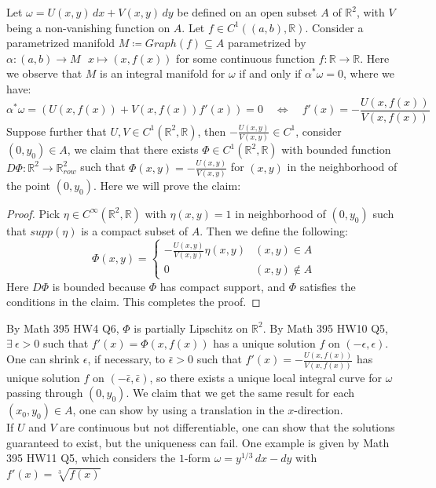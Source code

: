 \documentclass[15pt]{book}
\theoremstyle{break}
\theoremstyle{break}
\newcommand{\R}{\mathbb{R}}
\begin{document}
Let $\omega = U(x,y)\, dx + V(x,y) \, dy$ be defined on an open subset $A$ of $\R^2$, with $V$ being a non-vanishing function on $A$. Let $f \in C^1((a,b),\R)$. Consider a parametrized manifold $M\coloneqq Graph(f) \subseteq A$ parametrized by $\alpha:(a,b) \to M \ \ \ x\mapsto (x,f(x))$ for some continuous function $f:\R \to \R$. Here we observe that $M$ is an integral manifold for $\omega$ if and only if $\alpha^* \omega = 0$, where we have:
$$\alpha^*\omega = (U(x,f(x))+V(x,f(x))f'(x)) =0 \quad \iff \quad f'(x) =- \frac{U(x,f(x))}{V(x,f(x))}$$ 
Suppose further that $U,V \in C^1(\R^2,\R)$, then $-\frac{U(x,y)}{V(x,y)} \in C^1$, consider $(0,y_0) \in A$, we claim that there exists $\Phi \in C^1(\R^2,\R)$ with bounded function $D\Phi :\R^2 \to \R^2_{row}$ such that $\Phi (x,y) = -\frac{U(x,y)}{V(x,y)}$ for $(x,y)$ in the neighborhood of the point $(0,y_0)$. Here we will prove the claim:
\begin{proof}
Pick $\eta \in C^\infty (\R^2, \R)$ with $\eta(x,y) = 1$ in neighborhood of $(0,y_0)$ such that $supp(\eta)$ is a compact subset of $A$. Then we define the following:
$$\Phi(x,y) = \begin{cases}-\frac{U(x,y)}{V(x,y)}\eta(x,y) & (x,y) \in A \\ 0 &(x,y) \notin A \end{cases}$$
Here $D\Phi$ is bounded because $\Phi$ has compact support, and $\Phi$ satisfies the conditions in the claim. This completes the proof.
\end{proof}
By Math 395 HW4 Q6, $\Phi$ is partially Lipschitz on $\R^2$. By Math 395 HW10 Q5, $\exists\ \epsilon>0$ such that $f'(x) = \Phi(x,f(x))$ has a unique solution $f$ on $(-\epsilon,\epsilon)$. One can shrink $\epsilon$, if necessary, to $\bar{\epsilon}>0$ such that $f'(x) = -\frac{U(x,f(x))}{V(x,f(x))}$ has unique solution $f$ on $(-\bar{\epsilon},\bar{\epsilon})$, so there exists a unique local integral curve for $\omega$ passing through $(0,y_0)$. We claim that we get the same result for each $(x_0,y_0) \in A$, one can show by using a translation in the $x$-direction. \\

If $U$ and $V$ are continuous but not differentiable, one can show that the solutions guaranteed to exist, but the uniqueness can fail. One example is given by Math 395 HW11 Q5, which considers the $1$-form $\omega = y^{1/3}\,dx - dy$ with $f'(x) = \sqrt[3]{f(x)}$\\
\end{document}
